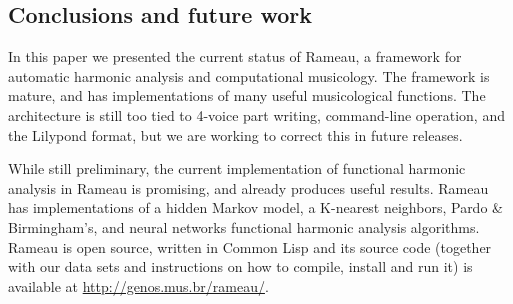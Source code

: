 \documentclass[a0paper]{sciposter}
\begin{document}
\begin{center}
\begin{multicols}{2}
\end{multicols}
\end{center}


\begin{multicols}{3}

\section{Conclusions and future work}
\label{sec:concl-future-work}

In this paper we presented the current status of Rameau, a framework
for automatic harmonic analysis and computational musicology. The
framework is mature, and has implementations of many useful
musicological functions. The architecture is still too tied to 4-voice
part writing, command-line operation, and the Lilypond format, but we
are working to correct this in future releases.

While still preliminary, the current implementation of functional
harmonic analysis in Rameau is promising, and already produces useful
results. Rameau has implementations of a hidden Markov model, a
K-nearest neighbors, Pardo \& Birmingham's, and neural networks
functional harmonic analysis algorithms. Rameau is open source,
written in Common Lisp and its source code (together with our data
sets and instructions on how to compile, install and run it) is
available at \url{http://genos.mus.br/rameau/}.

\renewcommand{\refname}{References}



\end{multicols}
\end{document}
